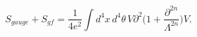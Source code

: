 \begin{equation}
S_{gauge} + S_{gf} = \frac{1}{4 e^2}\int d^4x\,d^4\theta\,
V\partial^2 \Big(1+ \frac{\partial^{2n}}{\Lambda^{2n}}\Big) V.
\end{equation}

